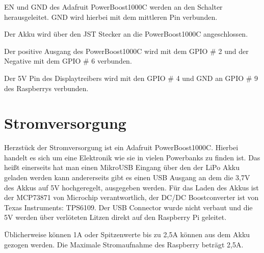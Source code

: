 EN und GND des Adafruit PowerBoost1000C werden an den Schalter herausgeleitet. GND wird hierbei mit dem mittleren Pin verbunden. 

Der Akku wird über den JST Stecker an die PowerBoost1000C angeschlossen. 

Der positive Ausgang des PowerBoost1000C wird mit dem GPIO \# 2 und der Negative mit dem GPIO \# 6 verbunden. 

Der 5V Pin des Displaytreibers wird mit den GPIO \# 4 und GND an GPIO \# 9 des Raspberrys verbunden. 

\section{Stromversorgung}

Herzstück der Stromversorgung ist ein Adafruit PowerBoost1000C. Hierbei handelt es sich um eine Elektronik wie sie in vielen Powerbanks zu finden ist. Das heißt einerseits hat man einen MikroUSB Eingang über den der LiPo Akku geladen werden kann andererseits gibt es einen USB Ausgang an dem die 3,7V des Akkus auf 5V hochgeregelt, ausgegeben werden. Für das Laden des Akkus ist der MCP73871 von Microchip verantwortlich, der DC/DC Boostconverter ist von Texas Instruments: TPS6109. Der USB Connector wurde nicht verbaut und die 5V werden über verlöteten Litzen direkt auf den Raspberry Pi geleitet. 

Üblicherweise können 1A oder Spitzenwerte bis zu 2,5A können aus dem Akku gezogen werden. Die Maximale Stromaufnahme des Raspberry beträgt 2,5A.  
